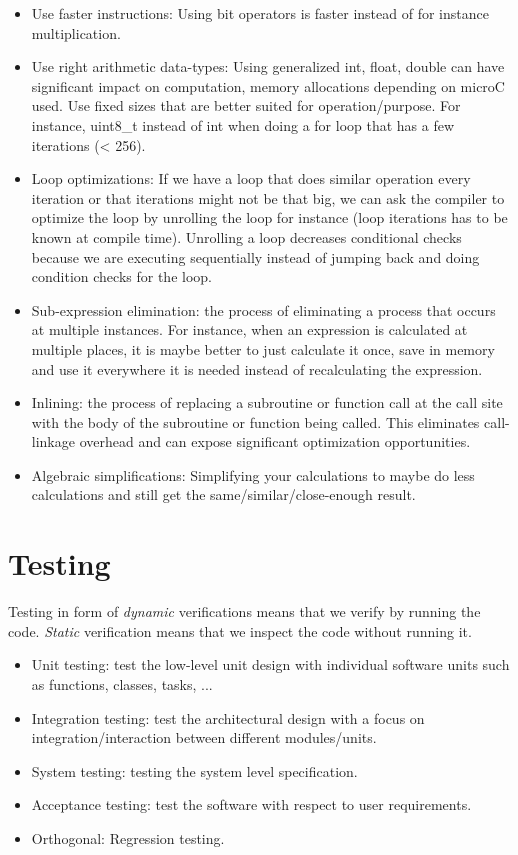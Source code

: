 \begin{itemize}
    \item Use faster instructions: Using bit operators is faster instead of for instance multiplication.
    \item Use right arithmetic data-types: Using generalized int, float, double can have significant impact on computation, memory allocations depending on microC used. Use fixed sizes that are better suited for operation/purpose. For instance, uint8\_t instead of int when doing a for loop that has a few iterations (< 256).
    \item Loop optimizations: If we have a loop that does similar operation every iteration or that iterations might not be that big, we can ask the compiler to optimize the loop by unrolling the loop for instance (loop iterations has to be known at compile time). Unrolling a loop decreases conditional checks because we are executing sequentially instead of jumping back and doing condition checks for the loop.
    \item Sub-expression elimination: the process of eliminating a process that occurs at multiple instances. For instance, when an expression is calculated at multiple places, it is maybe better to just calculate it once, save in memory and use it everywhere it is needed instead of recalculating the expression.
    \item Inlining: the process of replacing a subroutine or function call at the call site with the body of the subroutine or function being called. This eliminates call-linkage overhead and can expose significant optimization opportunities.
    \item Algebraic simplifications: Simplifying your calculations to maybe do less calculations and still get the same/similar/close-enough result.
\end{itemize}



\section{Testing}
Testing in form of \textit{dynamic} verifications means that we verify by running the code.
\textit{Static} verification means that we inspect the code without running it. 

\begin{itemize}
    \item Unit testing: test the low-level unit design with individual software units such as functions, classes, tasks, ...
    \item Integration testing: test the architectural design with a focus on integration/interaction between different modules/units.
    \item System testing: testing the system level specification.
    \item Acceptance testing: test the software with respect to user requirements.
    \item Orthogonal: Regression testing.
\end{itemize}

